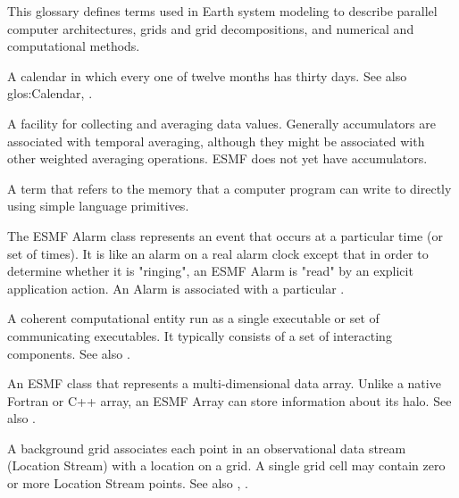 
\label{sec:glos}

This glossary defines terms used in Earth system modeling to describe 
parallel computer architectures, grids and grid decompositions, and 
numerical and computational methods.

\begin{description}

\label{glos:360DayCal}
\item[360-day calendar] A calendar in which 
  every one of twelve months has thirty days.  See also 
  {glos:Calendar}, .

\label{glos:Accumulator}
\item[Accumulator] A facility for collecting 
  and averaging data values.  Generally accumulators are associated with 
  temporal averaging, although they might be associated with 
  other weighted averaging operations.  ESMF does not yet have accumulators.
  
\label{glos:ASP}
\item[Address space (ASP)] A term that refers to 
  the memory that a computer program can write to directly using
  simple language primitives. 

\label{glos:Alarm}
\item[Alarm] The ESMF Alarm class represents an event that occurs at a particular 
  time (or set of times).  It is like an alarm on a real alarm clock 
  except that in order to determine whether it is "ringing", an ESMF Alarm 
  is "read" by an explicit application action.  An Alarm is associated
  with a particular .

\label{glos:Application}
\item[Application] A coherent computational 
  entity run as a single executable or set of communicating executables.  
  It typically consists of a set of interacting components.  
  See also .

\label{glos:Array}
\item[Array] An ESMF class that represents a multi-dimensional
  data array.  Unlike a native Fortran or C++ array, an ESMF Array can store information about its halo.  See also .

\label{glos:BackGrid}
\item[Background grid] 
  A background grid associates each point in an observational data stream 
  (Location Stream) with a location on a grid. A single grid cell may contain 
  zero or more Location Stream points. See also , . 


\end{description}
